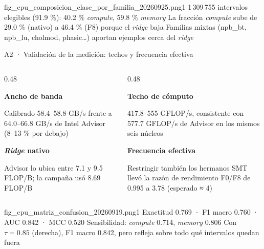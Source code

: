   {fig_cpu_composicion_clase_por_familia_20260925.png}{1}
  {1\,309\,755 intervalos elegibles (91.9 \%): 40.2 \% \textit{compute}, 59.8 \% \textit{memory}}
  {La fracción \textit{compute} sube de 29.0 \% (nativo) a 46.4 \% (F8) porque el \textit{ridge} baja}
  {Familias mixtas (npb\_bt, npb\_lu, cholmod, phasic…) aportan ejemplos cerca del \textit{ridge}}

\begin{frame}{A2 · Validación de la medición: techos y frecuencia efectiva}
  \vspace{3mm}
  \begin{columns}[T]
    \begin{column}{0.48\textwidth}
      \begin{card}[height=19mm]
        {\footnotesize\bfseries Ancho de banda}\par
        Calibrado 58.4--58.8 GB/s frente a 64.0--66.8 GB/s de Intel Advisor (8--13 \% por debajo)
      \end{card}
      \begin{card}[height=19mm]
        {\footnotesize\bfseries \textit{Ridge} nativo}\par
        Advisor lo ubica entre 7.1 y 9.5 FLOP/B; la campaña usó 8.69 FLOP/B
      \end{card}
    \end{column}
    \begin{column}{0.48\textwidth}
      \begin{card}[height=19mm]
        {\footnotesize\bfseries Techo de cómputo}\par
        417.8--555 GFLOP/s, consistente con 577.7 GFLOP/s de Advisor en los mismos seis núcleos
      \end{card}
      \begin{cardhi}[height=19mm]
        {\footnotesize\bfseries Frecuencia efectiva}\par
        Restringir también los hermanos SMT llevó la razón de rendimiento F0/F8 de 0.995 a 3.78 (esperado ≈ 4)
      \end{cardhi}
    \end{column}
  \end{columns}
\end{frame}


  {fig_cpu_matriz_confusion_20260919.png}{1}
  {Exactitud 0.769 · F1 macro 0.760 · AUC 0.842 · MCC 0.520}
  {Sensibilidad: \textit{compute} 0.714, \textit{memory} 0.806}
  {Con $\tau=0.85$ (derecha), F1 macro 0.842, pero refleja sobre todo qué intervalos quedan fuera}

